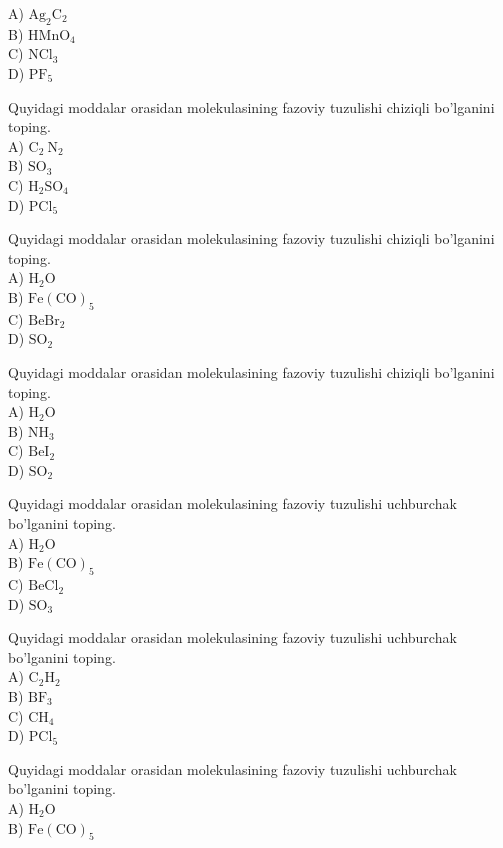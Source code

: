 A) $\mathrm{Ag}_{2} \mathrm{C}_{2}$\\
B) $\mathrm{HMnO}_{4}$\\
C) $\mathrm{NCl}_{3}$\\
D) $\mathrm{PF}_{5}$
  \item Quyidagi moddalar orasidan molekulasining fazoviy tuzulishi chiziqli bo'lganini toping.\\
A) $\mathrm{C}_{2} \mathrm{~N}_{2}$\\
B) $\mathrm{SO}_{3}$\\
C) $\mathrm{H}_{2} \mathrm{SO}_{4}$\\
D) $\mathrm{PCl}_{5}$
  \item Quyidagi moddalar orasidan molekulasining fazoviy tuzulishi chiziqli bo'lganini toping.\\
A) $\mathrm{H}_{2} \mathrm{O}$\\
B) $\mathrm{Fe}(\mathrm{CO})_{5}$\\
C) $\mathrm{BeBr}_{2}$\\
D) $\mathrm{SO}_{2}$
  \item Quyidagi moddalar orasidan molekulasining fazoviy tuzulishi chiziqli bo'lganini toping.\\
A) $\mathrm{H}_{2} \mathrm{O}$\\
B) $\mathrm{NH}_{3}$\\
C) $\mathrm{BeI}_{2}$\\
D) $\mathrm{SO}_{2}$
  \item Quyidagi moddalar orasidan molekulasining fazoviy tuzulishi uchburchak bo'lganini toping.\\
A) $\mathrm{H}_{2} \mathrm{O}$\\
B) $\mathrm{Fe}(\mathrm{CO})_{5}$\\
C) $\mathrm{BeCl}_{2}$\\
D) $\mathrm{SO}_{3}$\\
  \item Quyidagi moddalar orasidan molekulasining fazoviy tuzulishi uchburchak bo'lganini toping.\\
A) $\mathrm{C}_{2} \mathrm{H}_{2}$\\
B) $\mathrm{BF}_{3}$\\
C) $\mathrm{CH}_{4}$\\
D) $\mathrm{PCl}_{5}$
  \item Quyidagi moddalar orasidan molekulasining fazoviy tuzulishi uchburchak bo'lganini toping.\\
A) $\mathrm{H}_{2} \mathrm{O}$\\
B) $\mathrm{Fe}(\mathrm{CO})_{5}$\\
